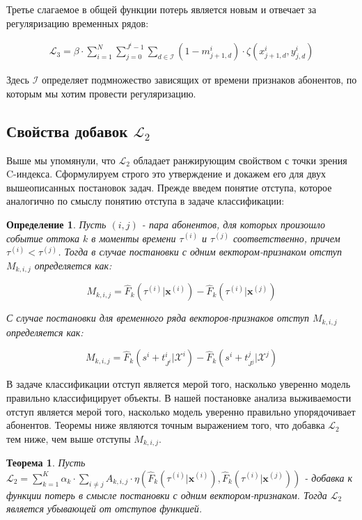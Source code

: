 \documentclass{article}
\newtheorem{theorem}{Теорема}
\newtheorem{definition}{Определение}
\begin{document}
Третье слагаемое в общей функции потерь является новым и отвечает за регуляризацию временных рядов: 

\begin{equation}
	\begin{aligned}
		\mathcal{L}_3=\beta\cdot\sum_{i=1}^N\sum_{j=0}^{J^i-1}\sum_{d\in\mathcal{I}}(1-m_{j+1,d}^i)\cdot\zeta(x_{j+1,d}^i,y_{j,d}^i)	
	\end{aligned}
\end{equation}		

Здесь $\mathcal{I}$ определяет подмножество зависящих от времени признаков абонентов, по которым мы хотим провести регуляризацию. 

\subsection{Свойства добавок $\mathcal{L}_2$}

Выше мы упомянули, что $\mathcal{L}_2$ обладает ранжирующим свойством с точки зрения C-индекса. Сформулируем строго это утверждение и докажем его для двух вышеописанных постановок задач. Прежде введем понятие отступа, которое аналогично по смыслу понятию отступа в задаче классификации: 

\begin{definition}
Пусть $(i,j)$ - пара абонентов, для которых произошло событие оттока $k$ в моменты времени $\tau^{(i)}$ и $\tau^{(j)}$ соответственно, причем $\tau^{(i)} < \tau^{(j)}$. Тогда в случае постановки с одним вектором-признаком отступ $M_{k,i,j}$ определяется как: 

$$M_{k,i,j} = \hat{F}_k(\tau^{(i)}|\mathbf{x}^{(i)}) - \hat{F}_k(\tau^{(i)}|\mathbf{x}^{(j)}) $$ 

С случае постановки для временного ряда векторов-признаков отступ $M_{k,i,j}$ определяется как:

$$M_{k,i,j} = \hat{F}_k(s^i+t_{J^i}^i|\mathcal{X}^i) - \hat{F}_k(s^i+t_{J^j}^j|\mathcal{X}^j)$$

\end{definition}

В задаче классификации отступ является мерой того, насколько уверенно модель правильно классифицирует объекты. В нашей постановке анализа выживаемости отступ является мерой того, насколько модель уверенно правильно упорядочивает абонентов. Теоремы ниже являются точным выражением того, что добавка $\mathcal{L}_2$ тем ниже, чем выше отступы $M_{k,i,j}$. 

\begin{theorem}
	Пусть $\mathcal{L}_2 =\sum_{k=1}^K\alpha_k\cdot\sum_{i\neq j}A_{k,i,j}\cdot\eta\left(\hat{F}_k(\tau^{(i)}|\mathbf{x}^{(i)}),\hat{F}_k(\tau^{(i)}|\mathbf{x}^{(j)})\right)$ - добавка к функции потерь в смысле постановки с одним вектором-признаком. Тогда $\mathcal{L}_2$ является убывающей от отступов функцией.  
\end{theorem}
\end{document}
